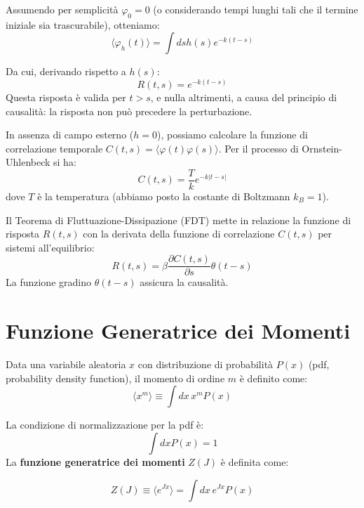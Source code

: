 Assumendo per semplicità $\varphi_0 = 0$ (o considerando tempi lunghi tali che il termine iniziale sia trascurabile), otteniamo:
\begin{equation}
\langle \varphi_h(t) \rangle = \int ds h(s) e^{-k(t-s)}
\end{equation}

Da cui, derivando rispetto a $h(s)$:
\begin{equation}
R(t,s) = e^{-k(t-s)}
\end{equation}
Questa risposta è valida per $t > s$, e nulla altrimenti, a causa del principio di causalità: la risposta non può precedere la perturbazione.

In assenza di campo esterno ($h=0$), possiamo calcolare la funzione di correlazione temporale $C(t,s) = \langle \varphi(t) \varphi(s) \rangle$. Per il processo di Ornstein-Uhlenbeck si ha:
\begin{equation}
C(t,s) = \frac{T}{k} e^{-k|t-s|}
\label{eq:corr_ou}
\end{equation}
dove $T$ è la temperatura (abbiamo posto la costante di Boltzmann $k_B=1$).

Il Teorema di Fluttuazione-Dissipazione (FDT) mette in relazione la funzione di risposta $R(t,s)$ con la derivata della funzione di correlazione $C(t,s)$ per sistemi all'equilibrio:
\begin{equation}
R(t,s) = \beta \frac{\partial C(t,s)}{\partial s} \theta(t-s)
\end{equation}
La funzione gradino $\theta(t-s)$ assicura la causalità.

\section{Funzione Generatrice dei Momenti}
Data una variabile aleatoria $x$ con distribuzione di probabilità $P(x)$ (pdf, probability density function), il momento di ordine $m$ è definito come:
\begin{equation}
\langle x^m \rangle \equiv \int dx \, x^m P(x)
\end{equation}

La condizione di normalizzazione per la pdf è:
\begin{equation}
\int dx P(x) = 1
\end{equation}
La \textbf{funzione generatrice dei momenti} $Z(J)$ è definita come:
\begin{tcolorbox}[
    colback=colorA!5,      
    colframe=colorA,       
    arc=3mm,               
    boxrule=1.2pt
]
\begin{equation}
Z(J) \equiv \langle e^{Jx} \rangle = \int dx \, e^{Jx} P(x)
\end{equation}
\end{tcolorbox}

